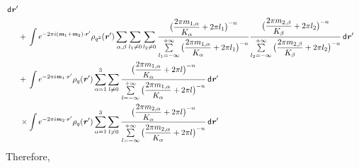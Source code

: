 \documentclass[aps,pre,preprint]{revtex4}
\renewcommand{\v}[1]{\textbf{\textit{#1}}}
\renewcommand{\d}[1]{\textsf{#1}}
\begin{document}
\begin{align}
  \,\d d\v r' \\\nonumber
  & + \,
  \int
  e^{-2\pi i (\v m_1 + \v m_2)\cdot\v r'}\rho_{q^2}(\v r')
  \sum_{\alpha, \beta}\sum_{l_1\neq 0}\sum_{l_2\neq 0}
  \frac
  {\big(\dfrac{2\pi m_{1,\alpha}}{K_\alpha} + 2\pi l_1\big)^{-n}}
  {\sum\limits_{l_1=-\infty}^{+\infty}
    \big(\dfrac{2\pi m_{1,\alpha}}{K_\alpha} + 2\pi l_1\big)^{-n}}
  \frac
  {\big(\dfrac{2\pi m_{2,\beta}}{K_\beta} + 2\pi l_2\big)^{-n}}
  {\sum\limits_{l_2=-\infty}^{+\infty}
    \big(\dfrac{2\pi m_{2,\beta}}{K_\beta} + 2\pi l_2\big)^{-n}}
  \,\d d\v r' \\\nonumber
  &+ \,
  \int
  e^{-2\pi i\v m_1\cdot\v r'}\rho_q(\v r')
  \sum_{\alpha=1}^3\sum_{l\neq 0}
  \frac
  {\big(\dfrac{2\pi m_{1,\alpha}}{K_\alpha} + 2\pi l\big)^{-n}}
  {\sum\limits_{l=-\infty}^{+\infty}
    \big(\dfrac{2\pi m_{1,\alpha}}{K_\alpha} + 2\pi l\big)^{-n}}
  \,\d d\v r' \\\nonumber
  &\,\times
  \int
  e^{-2\pi i\v m_2\cdot\v r'}\rho_q(\v r')
  \sum_{\alpha=1}^3\sum_{l\neq 0}
  \frac
  {\big(\dfrac{2\pi m_{2,\alpha}}{K_\alpha} + 2\pi l\big)^{-n}}
  {\sum\limits_{l=-\infty}^{+\infty}
    \big(\dfrac{2\pi m_{2,\alpha}}{K_\alpha} + 2\pi l\big)^{-n}}
  \,\d d\v r'  
\end{align}
Therefore,
\end{document}
